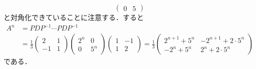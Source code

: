 \documentclass[a4paper,pdflatex,ja=standard]{bxjsarticle}
\begin{document}
\begin{enumerate}
\begin{equation}
\begin{pmatrix}
      0 & 5
    \end{pmatrix}
  \end{equation}
  と対角化できていることに注意する．すると
  \begin{align}
    A^{n}
    &=
    PDP^{-1}
    \cdots
    PDP^{-1}
    \nonumber
    \\
    &=    
    \frac{1}{3}
    \begin{pmatrix}
      2 & 1 \\
      -1 & 1
    \end{pmatrix}
    \begin{pmatrix}
      2^n & 0 \\
      0 & 5^n
    \end{pmatrix}
    \begin{pmatrix}
      1 & -1 \\
      1 & 2
    \end{pmatrix}
    =
    \frac{1}{3}
    \begin{pmatrix}
      2^{n+1}+5^{n} & -2^{n+1}+2\cdot5^{n} \\
      -2^{n}+5^{n} & 2^{n}+2\cdot5^{n}
    \end{pmatrix}
  \end{align}
  である．


\end{enumerate}
\end{document}
